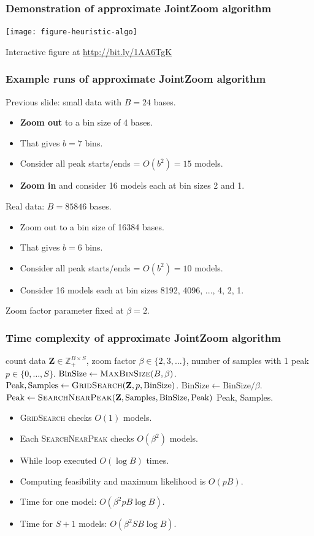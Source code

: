 \documentclass{beamer}
\newcommand{\ZZ}{\mathbb Z}
\begin{document}
\begin{frame}
  \frametitle{Demonstration of approximate JointZoom algorithm}

  \texttt{[image: figure-heuristic-algo]}

  Interactive figure at \url{http://bit.ly/1AA6TgK}
\end{frame}

\begin{frame}
  \frametitle{Example runs of approximate JointZoom algorithm}
Previous slide: small data with $B=24$ bases.
\begin{itemize}
\item \textbf{Zoom out} to a bin size of 4 bases.
\item That gives $b=7$ bins.
\item Consider all peak starts/ends = $O(b^2)=15$ models.
\item \textbf{Zoom in} and consider 16 models each at bin sizes 2 and 1.
\end{itemize}
Real data: $B=85846$ bases.
\begin{itemize}
\item Zoom out to a bin size of 16384 bases.
\item That gives $b=6$ bins.
\item Consider all peak starts/ends = $O(b^2)=10$ models.
\item Consider 16 models each at bin sizes 8192, 4096, ..., 4, 2, 1.
\end{itemize}
  Zoom factor parameter fixed at $\beta=2$.
\end{frame}
\begin{frame}
  \frametitle{Time complexity of approximate JointZoom algorithm}

\begin{algorithmic}[1]
  \REQUIRE count data $\mathbf Z\in\ZZ_+^{B\times S}$, zoom factor
  $\beta\in\{2, 3, \dots\}$, number of samples with 1
  peak $p\in\{0, \dots, S\}$.
  \STATE $\textrm{BinSize} \gets \textsc{MaxBinSize}(B, \beta)$. 
  \STATE $\textrm{Peak}, \textrm{Samples} \gets \label{gridsearch}
  \textsc{GridSearch}(\mathbf Z, p, \textrm{BinSize})$.
  \STATE $\textrm{BinSize} \gets \textrm{BinSize} / \beta$. 
  \STATE $\textrm{Peak} \gets
  \textsc{SearchNearPeak}(\mathbf Z, \textrm{Samples}, \label{searchnear}
  \textrm{BinSize}, \textrm{Peak})$
  \ENDWHILE
  \RETURN \textrm{Peak}, \textrm{Samples}.
\end{algorithmic}

\begin{itemize}
\item \textsc{GridSearch} checks $O(1)$ models.
\item Each \textsc{SearchNearPeak} checks $O(\beta^2)$ models.
\item While loop executed $O(\log B)$ times.
\item Computing feasibility and maximum likelihood is $O(pB)$.
\item Time for one model: $O(\beta^2 pB\log B)$.
\item Time for $S+1$ models: $O(\beta^2 S B\log B)$.
\end{itemize}

\end{frame}
\end{document}
